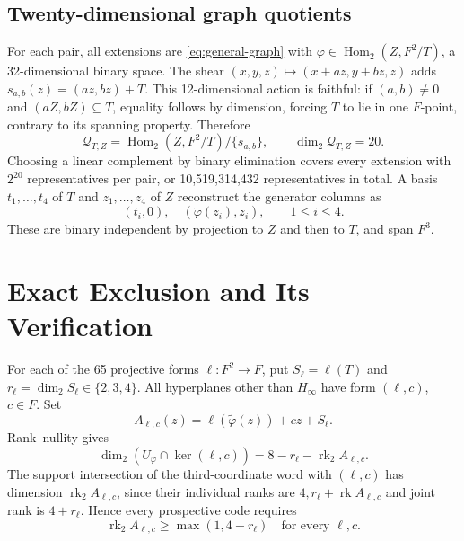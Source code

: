 \documentclass[12pt,letterpaper,onecolumn]{article}
\theoremstyle{definition}
\begin{document}
\subsection{Twenty-dimensional graph quotients}
For each pair, all extensions are \eqref{eq:general-graph} with $\varphi\in\operatorname{Hom}_2(Z,F^2/T)$, a 32-dimensional binary space. The shear $(x,y,z)\mapsto(x+az,y+bz,z)$ adds $s_{a,b}(z)=(az,bz)+T$. This 12-dimensional action is faithful: if $(a,b)\ne0$ and $(aZ,bZ)\subseteq T$, equality follows by dimension, forcing $T$ to lie in one $F$-point, contrary to its spanning property. Therefore
\begin{equation}
 \mathcal Q_{T,Z}=\operatorname{Hom}_2(Z,F^2/T)/\{s_{a,b}\},
 \qquad\dim_2\mathcal Q_{T,Z}=20.
 \label{eq:20}
\end{equation}
Choosing a linear complement by binary elimination covers every extension with $2^{20}$ representatives per pair, or 10,519,314,432 representatives in total. A basis $t_1,\ldots,t_4$ of $T$ and $z_1,\ldots,z_4$ of $Z$ reconstruct the generator columns as
\begin{equation}
 (t_i,0),\quad (\widetilde\varphi(z_i),z_i),\qquad1\le i\le4.
 \label{eq:columns}
\end{equation}
These are binary independent by projection to $Z$ and then to $T$, and span $F^3$.

\section{Exact Exclusion and Its Verification}
For each of the 65 projective forms $\ell:F^2\to F$, put $S_\ell=\ell(T)$ and $r_\ell=\dim_2S_\ell\in\{2,3,4\}$. All hyperplanes other than $H_\infty$ have form $(\ell,c)$, $c\in F$. Set
\begin{equation}
 A_{\ell,c}(z)=\ell(\widetilde\varphi(z))+cz+S_\ell.
 \label{eq:singlemap}
\end{equation}
Rank--nullity gives
\begin{equation}
 \dim_2(U_\varphi\cap\ker(\ell,c))=8-r_\ell-\operatorname{rk}_2A_{\ell,c}.
 \label{eq:hyperrank}
\end{equation}
The support intersection of the third-coordinate word with $(\ell,c)$ has dimension $\operatorname{rk}_2A_{\ell,c}$, since their individual ranks are $4,r_\ell+\operatorname{rk}A_{\ell,c}$ and joint rank is $4+r_\ell$. Hence every prospective code requires
\begin{equation}
 \operatorname{rk}_2A_{\ell,c}\ge\max(1,4-r_\ell)
 \quad\text{for every }\ell,c.
 \label{eq:necessary}
\end{equation}
\end{document}
